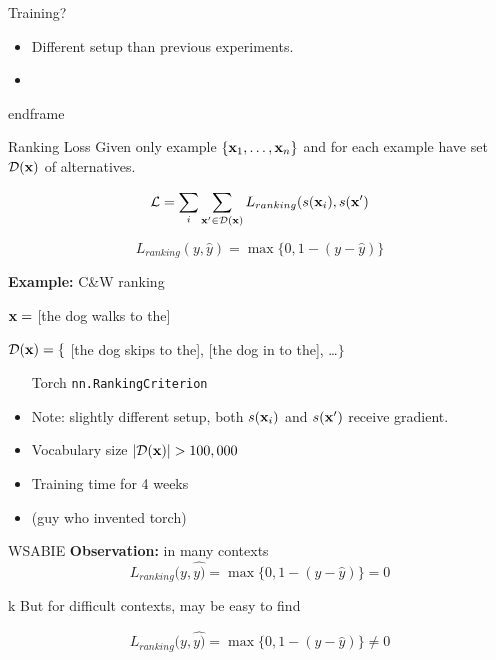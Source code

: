 \documentclass{beamer}
\begin{document}
\begin{frame}{Training?}
  \begin{itemize}
  \item Different setup than previous experiments.

    \air
  \item
  \end{itemize}
end{frame}


\begin{frame}{Ranking Loss}
  Given only example $\{ \mathbf{x}_1, \ldots, \mathbf{x}_n \}$ and for
  each example have set $\mathcal{D}(\mathbf{x})$ of alternatives.

  \[ \mathcal{L} = \sum_i \sum_{\mathbf{x}' \in \mathcal{D}(\mathbf{x})} L_{ranking}(s(\mathbf{x}_i), s(\mathbf{x}') \]

  \[ L_{ranking}(y, \hat{y}) = \max\{0, 1 - (y - \hat{y}) \}   \]

  \textbf{Example:} C\&W ranking

  $\mathbf{x} =$ [the dog walks to the]

  $\mathcal{D}(\mathbf{x}) = \{$ [the dog skips to the], [the dog in to the], \ldots $\}$

  \begin{itemize}
  \item [Torch \texttt{nn.RankingCriterion}]
    \air
  \item Note: slightly different setup, both $s(\mathbf{x}_i)$ and $s(\mathbf{x}')$ receive gradient.
  \end{itemize}
\end{frame}

\begin{frame}
  \begin{itemize}
  \item Vocabulary size $|\mathcal{D}(\mathbf{x})| > 100,000$
    \air

  \item Training time for 4 weeks
    \air

  \item (guy who invented torch)
  \end{itemize}
\end{frame}

\begin{frame}{WSABIE}
  \textbf{Observation:} in many contexts
  \[ L_{ranking}(y, \hat{y)} = \max\{0, 1 - (y - \hat{y}) \} = 0 \]

  \air
k
  But for difficult contexts, may be easy to find

  \[ L_{ranking}(y, \hat{y)} = \max\{0, 1 - (y - \hat{y}) \} \neq 0 \]


\end{frame}
\end{frame}
\end{document}
